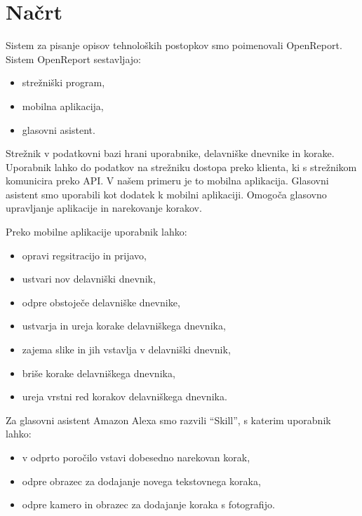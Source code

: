 \documentclass[a4paper, 12pt]{book}
\begin{document}
\section{Načrt}

Sistem za pisanje opisov tehnoloških postopkov smo poimenovali OpenReport. 
Sistem OpenReport sestavljajo:

\begin{itemize}
	\item strežniški program, 
	\item mobilna aplikacija,
	\item glasovni asistent.
\end{itemize}

Strežnik v podatkovni bazi hrani uporabnike, delavniške dnevnike in korake.
Uporabnik lahko do podatkov na strežniku dostopa preko klienta, ki s strežnikom komunicira preko API.
V našem primeru je to mobilna aplikacija.
Glasovni asistent smo uporabili kot dodatek k mobilni aplikaciji.
Omogoča glasovno upravljanje aplikacije in narekovanje korakov.

\noindent Preko mobilne aplikacije uporabnik lahko:
\begin{itemize}
	\item opravi regsitracijo in prijavo,
	\item ustvari nov delavniški dnevnik,
	\item odpre obstoječe delavniške dnevnike,
	\item ustvarja in ureja korake delavniškega dnevnika,
	\item zajema slike in jih vstavlja v delavniški dnevnik,
	\item briše korake delavniškega dnevnika,
	\item ureja vrstni red korakov delavniškega dnevnika.
\end{itemize}

Za glasovni asistent Amazon Alexa smo razvili \enquote{Skill}, s katerim uporabnik lahko:

\begin{itemize}
	\item v odprto poročilo vstavi dobesedno narekovan korak,
	\item odpre obrazec za dodajanje novega tekstovnega koraka,
	\item odpre kamero in obrazec za dodajanje koraka s fotografijo.
\end{itemize}
\end{document}
